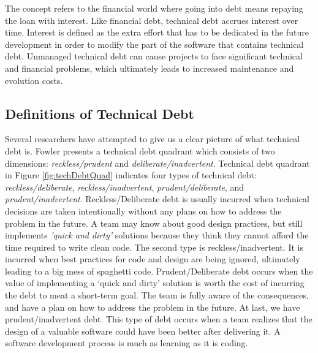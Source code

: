 The concept refers to the financial world where going into debt means repaying the loan with interest\cite{p50-allman}. Like financial debt, technical debt accrues interest over time. Interest is defined as the extra effort that has to be dedicated in the future development in order to modify the part of the software that contains technical debt\cite{p31-guo,p35-klinger,li2015systematic}. Unmanaged technical debt can cause projects to face significant technical and financial problems, which ultimately leads to increased maintenance and evolution costs\cite{nord2012search}. 



\subsection{Definitions of Technical Debt}
Several researchers have attempted to give us a clear picture of what technical debt is\cite{url-fowler,url-mcconnell,krutchen}. Fowler\cite{url-fowler} presents a technical debt quadrant which consists of two dimensions: \textit{reckless/prudent} and \textit{deliberate/inadvertent}\cite{url-fowler}. Technical debt quadrant in Figure \ref{fig:techDebtQuad} indicates four types of technical debt: \textit{reckless/deliberate}, \textit{reckless/inadvertent}, \textit{prudent/deliberate}, and \textit{prudent/inadvertent}. Reckless/Deliberate debt is usually incurred when technical decisions are taken intentionally without any plans on how to address the problem in the future. A team may know about good design practices, but still implements \textit{'quick and dirty'} solutions because they think they cannot afford the time required to write clean code. The second type is reckless/inadvertent. It is incurred when best practices for code and design are being ignored, ultimately leading to a big mess of spaghetti code. Prudent/Deliberate debt occurs when the value of implementing a ‘quick and dirty’ solution is worth the cost of incurring the debt to meat a short-term goal. The team is fully aware of the consequences, and have a plan on how to address the problem in the future. At last, we have prudent/inadvertent debt. This type of debt occurs when a team realizes that the design of a valuable software could have been better after delivering it. A software development process is much as learning as it is coding.

